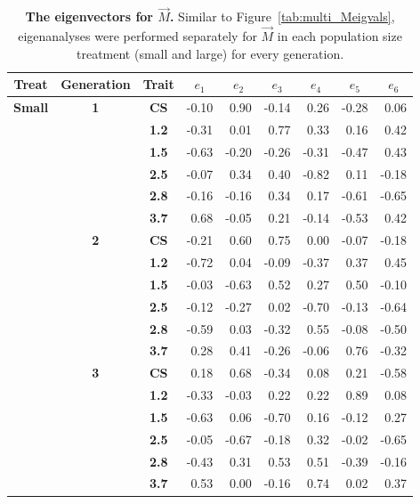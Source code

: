 \begin{table}[htp]
\renewcommand{\arraystretch}{0.8}
\caption[The eigenvectors for $\vec{M}$.]{\textbf{The eigenvectors for $\vec{M}$.} Similar to Figure~\ref{tab:multi_Meigvals}, eigenanalyses were performed separately for $\vec{M}$ in each population size treatment (small and large) for every generation.}
\scriptsize
\label{tab:multi_suppEigVecM}
\begin{center}
\begin{tabular}{>{\bfseries}c>{\bfseries}c>{\bfseries}crrrrrr}
\toprule
\textbf{Treat} & \textbf{Generation} & \textbf{Trait} & \multicolumn{1}{c}{$e_1$}&\multicolumn{1}{c}{$e_2$} & \multicolumn{1}{c}{$e_3$} & \multicolumn{1}{c}{$e_4$} & \multicolumn{1}{c}{$e_5$} & \multicolumn{1}{c}{$e_6$}\\
\midrule
Small & 1 & CS & -0.10 & 0.90 & -0.14 & 0.26 & -0.28 & 0.06\\
 &  & 1.2 & -0.31 & 0.01 & 0.77 & 0.33 & 0.16 & 0.42\\
 &  & 1.5 & -0.63 & -0.20 & -0.26 & -0.31 & -0.47 & 0.43\\
 &  & 2.5 & -0.07 & 0.34 & 0.40 & -0.82 & 0.11 & -0.18\\
 &  & 2.8 & -0.16 & -0.16 & 0.34 & 0.17 & -0.61 & -0.65\\
 &  & 3.7 & 0.68 & -0.05 & 0.21 & -0.14 & -0.53 & 0.42\\ \cmidrule{2-9}
 & 2 & CS & -0.21 & 0.60 & 0.75 & 0.00 & -0.07 & -0.18\\
 &  & 1.2 & -0.72 & 0.04 & -0.09 & -0.37 & 0.37 & 0.45\\
 &  & 1.5 & -0.03 & -0.63 & 0.52 & 0.27 & 0.50 & -0.10\\
 &  & 2.5 & -0.12 & -0.27 & 0.02 & -0.70 & -0.13 & -0.64\\
 &  & 2.8 & -0.59 & 0.03 & -0.32 & 0.55 & -0.08 & -0.50\\
 &  & 3.7 & 0.28 & 0.41 & -0.26 & -0.06 & 0.76 & -0.32\\\cmidrule{2-9}
 & 3 & CS & 0.18 & 0.68 & -0.34 & 0.08 & 0.21 & -0.58\\
 &  & 1.2 & -0.33 & -0.03 & 0.22 & 0.22 & 0.89 & 0.08\\
 &  & 1.5 & -0.63 & 0.06 & -0.70 & 0.16 & -0.12 & 0.27\\
 &  & 2.5 & -0.05 & -0.67 & -0.18 & 0.32 & -0.02 & -0.65\\
 &  & 2.8 & -0.43 & 0.31 & 0.53 & 0.51 & -0.39 & -0.16\\
 &  & 3.7 & 0.53 & 0.00 & -0.16 & 0.74 & 0.02 & 0.37\\\cmidrule{2-9}

\end{tabular}
\end{center}
\end{table}
